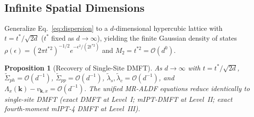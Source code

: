 \documentclass[11pt,a4paper]{article}
\numberwithin{equation}{section}
\theoremstyle{plain}
\newtheorem{proposition}{Proposition}[section]
\theoremstyle{definition}
\providecommand{\vk}{\mathbf{k}}
\begin{document}
\subsection{Infinite Spatial Dimensions}
\label{sec:d_inf}

Generalize Eq.~\eqref{eq:dispersion} to a $d$-dimensional hypercubic lattice with
$t = t^*/\sqrt{2d}$ ($t^*$ fixed as $d \to \infty$), yielding the finite Gaussian
density of states $\rho(\epsilon) = (2\pi t^{*2})^{-1/2}e^{-\epsilon^2/(2t^{*2})}$
and $M_2 = t^{*2} = \mathcal{O}(d^0)$.

\begin{proposition}[Recovery of Single-Site DMFT]
As $d \to \infty$ with $t = t^*/\sqrt{2d}$, $\tilde{\Sigma}_{ph} = \mathcal{O}(d^{-1})$,
$\tilde{\Sigma}_{pp} = \mathcal{O}(d^{-1})$, $\tilde{\lambda}_s, \tilde{\lambda}_c = \mathcal{O}(d^{-1})$,
and $\Lambda_x(\vk) - v_{\vk,x} = \mathcal{O}(d^{-1})$. The unified MR-ALDF equations
reduce identically to single-site DMFT (exact DMFT at Level~I; mIPT-DMFT at Level~II;
exact fourth-moment mIPT-4 DMFT at Level~III).
\end{proposition}
\end{document}
